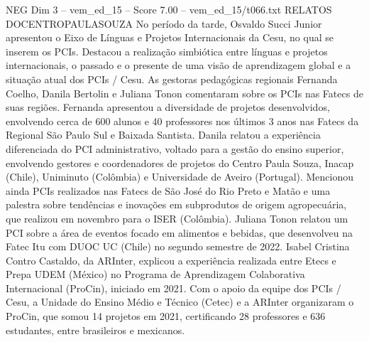 \begin{textsample}{NEG Dim 3 – vem\_ed\_15 – Score 7.00 – vem\_ed\_15/t066.txt}  \label{ex:f3_neg_113}
RELATOS DOCENTROPAULASOUZA No período da tarde, Osvaldo Succi Junior apresentou o Eixo de Línguas e Projetos Internacionais da Cesu, no qual se inserem os PCIs.
Destacou a realização simbiótica entre línguas e projetos internacionais, o passado e o presente de uma visão de aprendizagem global e a situação atual dos PCIs / Cesu.
As gestoras pedagógicas regionais Fernanda Coelho, Danila Bertolin e Juliana Tonon comentaram sobre os PCIs nas Fatecs de suas regiões.
Fernanda apresentou a diversidade de projetos desenvolvidos, envolvendo cerca de 600 alunos e 40 professores nos últimos 3 anos nas Fatecs da Regional São Paulo Sul e Baixada Santista.
Danila relatou a experiência diferenciada do PCI administrativo, voltado para a gestão do ensino superior, envolvendo gestores e coordenadores de projetos do Centro Paula Souza, Inacap (Chile), Uniminuto (Colômbia) e Universidade de Aveiro (Portugal).
Mencionou ainda PCIs realizados nas Fatecs de São José do Rio Preto e Matão e uma palestra sobre tendências e inovações em subprodutos de origem agropecuária, que realizou em novembro para o ISER (Colômbia).
Juliana Tonon relatou um PCI sobre a área de eventos focado em alimentos e bebidas, que desenvolveu na Fatec Itu com DUOC UC (Chile) no segundo semestre de 2022.
Isabel Cristina Contro Castaldo, da ARInter, explicou a experiência realizada entre Etecs e Prepa UDEM (México) no Programa de Aprendizagem Colaborativa Internacional (ProCin), iniciado em 2021.
Com o apoio da equipe dos PCIs / Cesu, a Unidade do Ensino Médio e Técnico (Cetec) e a ARInter organizaram o ProCin, que somou 14 projetos em 2021, certificando 28 professores e 636 estudantes, entre brasileiros e mexicanos.

\end{textsample}
